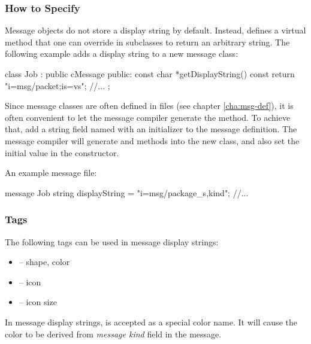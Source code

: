 \subsubsection{How to Specify}
\label{sec:graphics:specifying-message-displaystrings}

Message objects do not store a display string by default. Instead,
 defines a virtual  method
that one can override in subclasses to return an arbitrary string.
The following example adds a display string to a new message class:

\begin{cpp}
class Job : public cMessage
{
  public:
    const char *getDisplayString() const {return "i=msg/packet;is=vs";}
    //...
};
\end{cpp}

Since message classes are often defined in  files (see chapter
\ref{cha:msg-def}), it is often convenient to let the message compiler
generate the  method. To achieve that, add a
string field named  with an initializer to the message
definition. The message compiler will generate 
and  methods into the new class, and also set the
initial value in the constructor.

An example message file:

\begin{msg}
message Job
{
    string displayString = "i=msg/package_s,kind";
    //...
}
\end{msg}

\subsubsection{Tags}
\label{sec:graphics:message-displaystring-tags}

The following tags can be used in message display strings:

\begin{itemize}
  \item {} -- shape, color
  \item {} -- icon
  \item {} -- icon size
\end{itemize}

\begin{note}
   In message display strings,  is accepted as a special color name.
   It will cause the color to be derived from \textit{message kind} field in the message.
\end{note}

